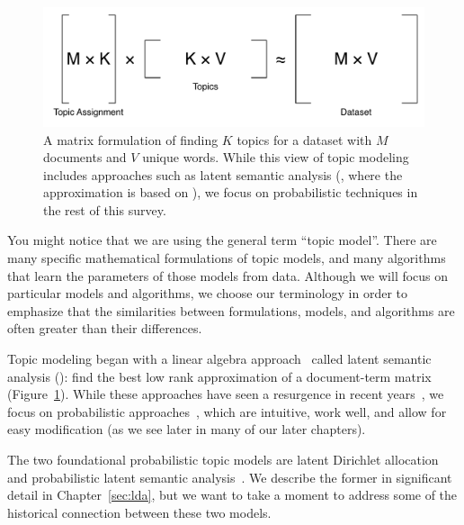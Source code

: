 \begin{center}
\begin{figure}
  \begin{center}
  \includegraphics[width=.8\linewidth]{figures/matrix_factorization}
  \end{center}

  \caption{A matrix formulation of finding $K$ topics for a dataset
    with $M$ documents and $V$ unique words.  While this view of topic
    modeling includes approaches such as latent semantic analysis
    (, where the approximation is based on ), we
    focus on probabilistic techniques in the rest of this survey.}
  \label{fig:matrix_topics}
\end{figure}
\end{center}

You might notice that we are using the general term ``topic model''.
There are many specific mathematical formulations of topic models, and many algorithms that learn the parameters of those models from data.
Although we will focus on particular models and algorithms, we choose our terminology in order to emphasize that the similarities between formulations, models, and algorithms are often greater than their differences.

Topic modeling began with a linear algebra approach~\citep{deerwester-90} called
latent semantic analysis (): find the best low rank approximation of a
document-term matrix (Figure~\ref{fig:matrix_topics}).  While these approaches
have seen a resurgence in recent years~\citep{anandkumar-12:lda,arora-13}, we
focus on probabilistic approaches~\citep{hofmann-99,papadimitriou-00,blei-03},
which are intuitive, work well, and allow for
easy modification (as we see later in many of our later chapters).

The two foundational probabilistic topic models are latent Dirichlet
allocation~\citep[]{blei-03} and probabilistic latent
semantic analysis~\citep[\plsa{}]{hofmann-99}.  We describe the
former in significant detail in Chapter~\ref{sec:lda}, but we want to
take a moment to address some of the historical connection between
these two models.

